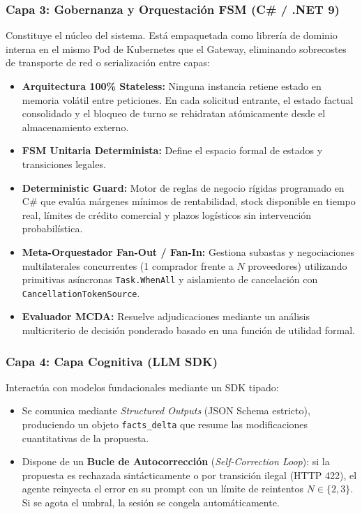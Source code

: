 \subsubsection{Capa 3: Gobernanza y Orquestación FSM (C\# / .NET 9)}
Constituye el núcleo del sistema. Está empaquetada como librería de dominio interna en el mismo Pod de Kubernetes que el Gateway, eliminando sobrecostes de transporte de red o serialización entre capas:
\begin{itemize}
    \item \textbf{Arquitectura 100\% Stateless:} Ninguna instancia retiene estado en memoria volátil entre peticiones. En cada solicitud entrante, el estado factual consolidado y el bloqueo de turno se rehidratan atómicamente desde el almacenamiento externo.
    \item \textbf{FSM Unitaria Determinista:} Define el espacio formal de estados y transiciones legales.
    \item \textbf{Deterministic Guard:} Motor de reglas de negocio rígidas programado en C\# que evalúa márgenes mínimos de rentabilidad, stock disponible en tiempo real, límites de crédito comercial y plazos logísticos sin intervención probabilística.
    \item \textbf{Meta-Orquestador Fan-Out / Fan-In:} Gestiona subastas y negociaciones multilaterales concurrentes (1 comprador frente a $N$ proveedores) utilizando primitivas asíncronas \texttt{Task.WhenAll} y aislamiento de cancelación con \texttt{CancellationTokenSource}.
    \item \textbf{Evaluador MCDA:} Resuelve adjudicaciones mediante un análisis multicriterio de decisión ponderado basado en una función de utilidad formal.
\end{itemize}

\subsubsection{Capa 4: Capa Cognitiva (LLM SDK)}
Interactúa con modelos fundacionales mediante un SDK tipado:
\begin{itemize}
    \item Se comunica mediante \textit{Structured Outputs} (JSON Schema estricto), produciendo un objeto \texttt{facts\_delta} que resume las modificaciones cuantitativas de la propuesta.
    \item Dispone de un \textbf{Bucle de Autocorrección} (\textit{Self-Correction Loop}): si la propuesta es rechazada sintácticamente o por transición ilegal (HTTP 422), el agente reinyecta el error en su prompt con un límite de reintentos $N \in \{2, 3\}$. Si se agota el umbral, la sesión se congela automáticamente.
\end{itemize}

